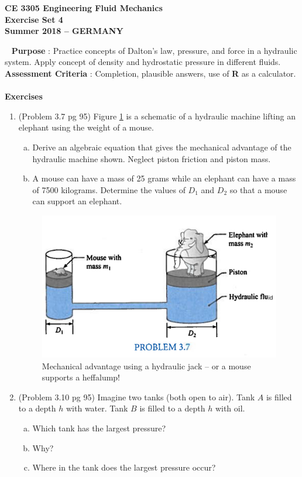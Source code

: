 \documentclass[12pt]{article}
\begin{document}
\begingroup
\begin{center}
{\textbf{{ CE 3305 Engineering Fluid Mechanics} \\ Exercise Set 4 \\ Summer 2018 -- GERMANY} }
\end{center}
\endgroup
\begingroup
~\newline
\textbf{Purpose} : Practice concepts of Dalton's law, pressure, and force in a hydraulic system. Apply concept of density and hydrostatic pressure in different fluids.\\
\textbf{Assessment Criteria} : Completion, plausible answers, use of \textbf{R} as a calculator. \\~\\
\textbf{Exercises}

\begin{enumerate}
\item (Problem 3.7 pg 95)
Figure \ref{fig:MouseElephant} is a schematic of a hydraulic machine lifting an elephant using the weight of a mouse.
\begin{enumerate}[a)]
\item Derive an algebraic equation that gives the mechanical advantage of the hydraulic machine shown.  
Neglect piston friction and piston mass.
\item A mouse can have a mass of 25 grams while an elephant can have a mass of 7500 kilograms.   Determine the values of $D_1$ and $D_2$ so that a mouse can support an elephant.
\end{enumerate}
\begin{figure}[htbp] %
   \centering
   \includegraphics[width=5in]{MouseElephant.jpg} 
   \caption{Mechanical advantage using a hydraulic jack -- or a mouse supports a heffalump!}
   \label{fig:MouseElephant}
\end{figure}
\newpage
\item (Problem 3.10 pg 95)
Imagine two tanks (both open to air).  Tank $A$ is filled to a depth $h$ with water.
Tank $B$ is filled to a depth $h$ with oil.
\begin{enumerate}[a)]
\item Which tank has the largest pressure?
\item Why?
\item Where in the tank does the largest pressure occur?
\end{enumerate}
\end{enumerate}
\end{document}
